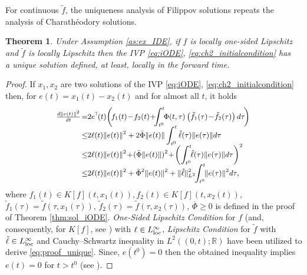\documentclass{article}
\newcommand{\R}{\mathbb{R}}
\newtheorem{theorem}{Theorem}
\begin{document}
	For continuous $\tilde f$, the uniqueness analysis of Filippov solutions repeats the  analysis of Charath\'eodory  solutions.
	\begin{theorem}\itshape\label{thm:uniq_one_side_IDE}
		Under Assumption \ref{as:ex_IDE},
		if $f$ is locally one-sided Lipschitz  and $\tilde f$ is locally Lipschitz  then the IVP \eqref{eq:iODE}, \eqref{eq:ch2_initialcondition} has\\ a  unique solution defined, at least, locally in the forward time. 
	\end{theorem}
\begin{proof}
	If $x_1,x_2$ are two solutions of the IVP \eqref{eq:iODE}, \eqref{eq:ch2_initialcondition} then, for $e(t)=x_1(t)-x_2(t)$  and for almost all $t$, it holds  \vspace{-1mm}
	\begin{equation}\label{eq:proof_unique}\small
\begin{split}
		\!\!\!\!\!\tfrac{d \|e(t)\|^2}{dt}\!=&2e^{\!\top}\!(t)\! \left(\! f_1(t)\!-\! f_2(t)\!+\!\!\!\int^t_{t^0}\!\!\Phi(t,\tau) \left(\tilde f_1(\tau)\!-\! \tilde f_2(\tau)\right) d\tau\!\right)\\[-2mm]
	\leq& 2\ell(t)\|e(t)\|^2+2\bar \Phi \|e(t)\|\int^t_{t^0} \tilde \ell(\tau)\|e(\tau)\| d\tau\\[-2mm]
	\leq& 2\ell(t)\|e(t)\|^2\!+\!(\bar \Phi \|e(t)\|)^2\!+\!\left(\int^t_{t^0} \!\!\tilde \ell(\tau)\|e(\tau)\| d\tau\right)^2\\[-2mm]
	\leq &2\ell(t)\|e(t)\|^2+\bar \Phi^2\|e(t)\|^2+\|\tilde \ell\|_{L^2}^2\!\!\int^t_{t^0}\!\! \|e(\tau)\|^2 d\tau, 
	\end{split}\!\!\!\!\vspace{-1mm}
	\end{equation}
	where $f_1(t)\in K[f](t,x_1(t)), f_2(t)\in K[f](t,x_2(t))$, $\tilde f_1(\tau)=\tilde f(\tau,x_1(\tau))$, $\tilde f_2(\tau)=\tilde f(\tau,x_2(\tau))$, $\overline{\Phi}\geq 0$ is defined in the proof of Theorem \ref{thm:sol_iODE}. \textit{One-Sided  Lipschitz Condition} for $f$ (and, consequently, for $K[f]$, see \cite[page 106]{Filippov1988:Book}) with $\ell\in L^{\infty}_{\rm loc}$, \textit{Lipschitz Condition}  for $\tilde f$ with $\tilde \ell\in L^{\infty}_{\rm loc}$ and Cauchy--Schwartz inequality in $L^2((0,t);\R)$ have been utilized to derive \eqref{eq:proof_unique}. Since, $e(t^0)=0$ then the obtained  inequality implies $e(t)\!=\!0$ for $t\!>\!t^0$ (see \cite{Pachpatte1975:JMAA}).\!\!\!\!
\end{proof}
\end{document}
